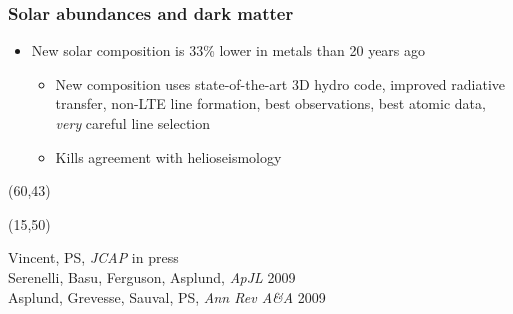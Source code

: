 \documentclass[xcolor=dvipsnames]{beamer}
\begin{document}
\begin{frame}
\frametitle{Solar abundances and dark matter}
  
  \begin{itemize}

  \item{New solar composition is 33\% lower in metals than 20 years ago
    \begin{itemize}
    \item{New composition uses state-of-the-art 3D hydro code, improved radiative transfer, non-LTE line formation, best observations, best atomic data, \emph{very} careful line selection}
    \item{Kills agreement with helioseismology \frownie}
    \end{itemize}}


  \end{itemize}

  \begin{textblock}{55}(60,43)
  \end{textblock}

  \begin{textblock}{40}(15,50)
  \end{textblock}

  \vspace{20mm}

  \tiny{\color[rgb]{0, 0, 0}\alert<2>{Vincent, PS, \emph{JCAP} in press}}\\
  \tiny{\color[rgb]{0, 0, 0}Serenelli, Basu, Ferguson, Asplund, \emph{ApJL} 2009}\\
  \tiny{\color[rgb]{0, 0, 0}Asplund, Grevesse, Sauval, PS, \emph{Ann Rev A\&A} 2009}

\end{frame}
\end{document}
